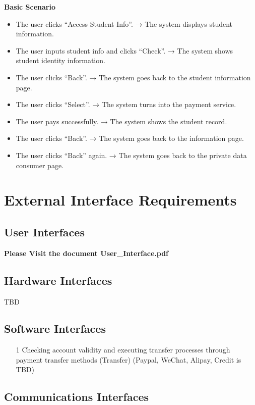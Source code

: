 \textbf{Basic Scenario}
\begin{itemize}
    \item The user clicks “Access Student Info”. → The system displays student information.
    \item The user inputs student info and clicks “Check”. → The system shows student identity information.
    \item The user clicks “Back”. → The system goes back to the student information page.
    \item The user clicks “Select”. → The system turns into the payment service.
    \item The user pays successfully. → The system shows the student record.
    \item The user clicks “Back”. → The system goes back to the information page.
    \item The user clicks “Back” again. → The system goes back to the private data consumer page.
\end{itemize}

\chapter{External Interface Requirements}

\section{User Interfaces}

\textbf{Please Visit the document User_Interface.pdf}

\section{Hardware Interfaces} 
TBD

\section{Software Interfaces} 
\begin{itemize}
    \item[1]Checking account validity and executing transfer processes through payment transfer methods (Transfer) (Paypal, WeChat, Alipay, Credit is TBD)
\end{itemize}

\section{Communications Interfaces}

